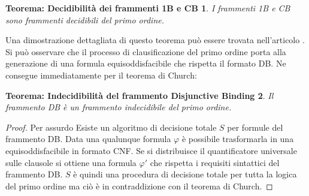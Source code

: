 \documentclass[./main.tex]{subfiles}
\begin{document}
\newtheorem{thm}{Teorema: Decidibilità dei frammenti 1B e CB}[section]
\begin{thm}
    I frammenti 1B e CB sono frammenti decidibili del primo ordine.
\end{thm}

Una dimostrazione dettagliata di questo teorema può essere trovata nell'articolo \cite{binding17}.
Si può osservare che il processo di clausificazione del primo ordine porta alla generazione di una formula equisoddisfacibile
che rispetta il formato DB. Ne consegue immediatamente per il teorema di Church:

\newtheorem{db}[thm]{Teorema: Indecidibilità del frammento Disjunctive Binding}
\begin{db}
    Il frammento DB è un frammento indecidibile del primo ordine.
\end{db}

\begin{proof}
Per assurdo Esiste un algoritmo di decisione totale $S$ per formule del frammento DB. Data una qualunque formula
$\varphi$ è possibile trasformarla in una equisoddisfacibile in formato CNF. Se si distribuisce il quantificatore 
universale sulle clausole si ottiene una formula $\varphi'$ che rispetta
i requisiti sintattici del frammento DB. $S$ è quindi una procedura di decisione totale per tutta la logica 
del primo ordine ma ciò è in contraddizione con il teorema di Church.
\end{proof}
\end{document}
